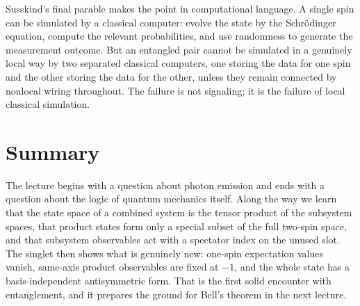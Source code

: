 Susskind's final parable makes the point in computational language. A single spin can be simulated by a classical computer: evolve the state by the Schr\"odinger equation, compute the relevant probabilities, and use randomness to generate the measurement outcome. But an entangled pair cannot be simulated in a genuinely local way by two separated classical computers, one storing the data for one spin and the other storing the data for the other, unless they remain connected by nonlocal wiring throughout. The failure is not signaling; it is the failure of local classical simulation.

\section{Summary}

The lecture begins with a question about photon emission and ends with a question about the logic of quantum mechanics itself. Along the way we learn that the state space of a combined system is the tensor product of the subsystem spaces, that product states form only a special subset of the full two-spin space, and that subsystem observables act with a spectator index on the unused slot. The singlet then shows what is genuinely new: one-spin expectation values vanish, same-axis product observables are fixed at \(-1\), and the whole state has a basis-independent antisymmetric form. That is the first solid encounter with entanglement, and it prepares the ground for Bell's theorem in the next lecture.